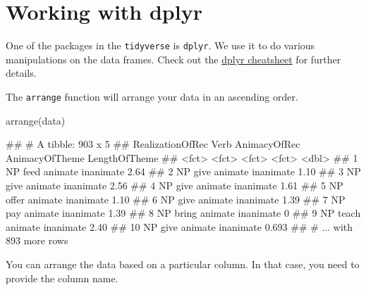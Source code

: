 \documentclass[
]{book}
\newenvironment{Shaded}{\begin{snugshade}}{\end{snugshade}}
\newcommand{\FunctionTok}[1]{\textcolor[rgb]{0.00,0.00,0.00}{#1}}
\newcommand{\NormalTok}[1]{#1}
\begin{document}
\hypertarget{working-with-dplyr}{%
\section{Working with dplyr}\label{working-with-dplyr}}

One of the packages in the \texttt{tidyverse} is \texttt{dplyr}. We use it to do various manipulations on the data frames. Check out the \href{https://nyu-cdsc.github.io/learningr/assets/data-transformation.pdf}{dplyr cheatsheet} for further details.

The \texttt{arrange} function will arrange your data in an ascending order.

\begin{Shaded}
\begin{Highlighting}[]
\FunctionTok{arrange}\NormalTok{(data)}
\end{Highlighting}
\end{Shaded}

\begin{Shaded}
\begin{Highlighting}[]
\NormalTok{\#\# \# A tibble: 903 x 5}
\NormalTok{\#\#    RealizationOfRec Verb  AnimacyOfRec AnimacyOfTheme LengthOfTheme}
\NormalTok{\#\#    \textless{}fct\textgreater{}            \textless{}fct\textgreater{} \textless{}fct\textgreater{}        \textless{}fct\textgreater{}                  \textless{}dbl\textgreater{}}
\NormalTok{\#\#  1 NP               feed  animate      inanimate              2.64 }
\NormalTok{\#\#  2 NP               give  animate      inanimate              1.10 }
\NormalTok{\#\#  3 NP               give  animate      inanimate              2.56 }
\NormalTok{\#\#  4 NP               give  animate      inanimate              1.61 }
\NormalTok{\#\#  5 NP               offer animate      inanimate              1.10 }
\NormalTok{\#\#  6 NP               give  animate      inanimate              1.39 }
\NormalTok{\#\#  7 NP               pay   animate      inanimate              1.39 }
\NormalTok{\#\#  8 NP               bring animate      inanimate              0    }
\NormalTok{\#\#  9 NP               teach animate      inanimate              2.40 }
\NormalTok{\#\# 10 NP               give  animate      inanimate              0.693}
\NormalTok{\#\# \# ... with 893 more rows}
\end{Highlighting}
\end{Shaded}

You can arrange the data based on a particular column. In that case, you need to provide the column name.
\end{document}

